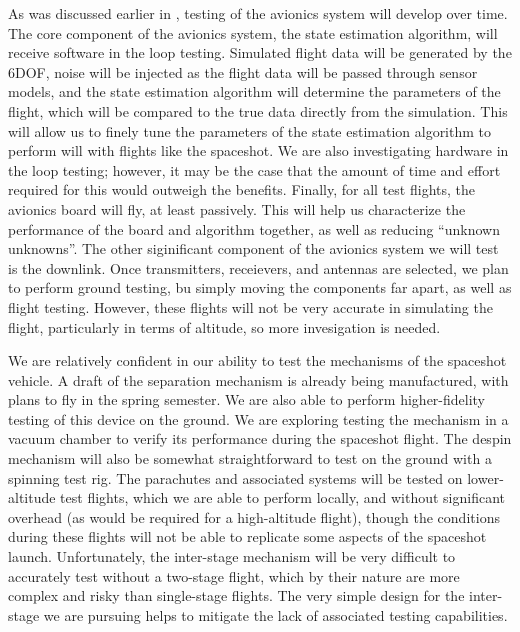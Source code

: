 As was discussed earlier in , testing of the avionics system will develop over time. The core component of the avionics system, the state estimation algorithm, will receive software in the loop testing. Simulated flight data will be generated by the 6DOF, noise will be injected as the flight data will be passed through sensor models, and the state estimation algorithm will determine the parameters of the flight, which will be compared to the true data directly from the simulation. This will allow us to finely tune the parameters of the state estimation algorithm to perform will with flights like the spaceshot. We are also investigating hardware in the loop testing; however, it may be the case that the amount of time and effort required for this would outweigh the benefits. Finally, for all test flights, the avionics board will fly, at least passively. This will help us characterize the performance of the board and algorithm together, as well as reducing ``unknown unknowns''. The other siginificant component of the avionics system we will test is the downlink. Once transmitters, receievers, and antennas are selected, we plan to perform ground testing, bu simply moving the components far apart, as well as flight testing. However, these flights will not be very accurate in simulating the flight, particularly in terms of altitude, so more invesigation is needed.

We are relatively confident in our ability to test the mechanisms of the spaceshot vehicle. A draft of the separation mechanism is already being manufactured, with plans to fly in the spring semester. We are also able to perform higher-fidelity testing of this device on the ground. We are exploring testing the mechanism in a vacuum chamber to verify its performance during the spaceshot flight. The despin mechanism will also be somewhat straightforward to test on the ground with a spinning test rig. The parachutes and associated systems will be tested on lower-altitude test flights, which we are able to perform locally, and without significant overhead (as would be required for a high-altitude flight), though the conditions during these flights will not be able to replicate some aspects of the spaceshot launch. Unfortunately, the inter-stage mechanism will be very difficult to accurately test without a two-stage flight, which by their nature are more complex and risky than single-stage flights. The very simple design for the inter-stage we are pursuing helps to mitigate the lack of associated testing capabilities.

